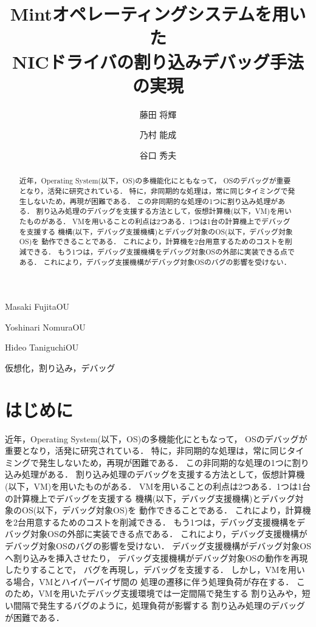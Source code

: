 \documentclass[submit,techreq,noauthor,dvipdfmx]{ipsj}
\begin{document}
\title{Mintオペレーティングシステムを用いた\\NICドライバの割り込みデバッグ手法の実現}


\author{藤田 将輝}{Masaki Fujita}{OU}
\author{乃村 能成}{Yoshinari Nomura}{OU}
\author{谷口 秀夫}{Hideo Taniguchi}{OU}

\begin{abstract}

    近年，Operating System(以下，OS)の多機能化にともなって，
    OSのデバッグが重要となり，活発に研究されている．
    特に，非同期的な処理は，常に同じタイミングで発生しないため，再現が困難である．
    この非同期的な処理の1つに割り込み処理がある．
    割り込み処理のデバッグを支援する方法として，仮想計算機(以下，VM)を用いたものがある．
    VMを用いることの利点は2つある．1つは1台の計算機上でデバッグを支援する
    機構(以下，デバッグ支援機構)とデバッグ対象のOS(以下，デバッグ対象OS)を
    動作できることである．
    これにより，計算機を2台用意するためのコストを削減できる．
    もう1つは，デバッグ支援機構をデバッグ対象OSの外部に実装できる点である．
    これにより，デバッグ支援機構がデバッグ対象OSのバグの影響を受けない．

\end{abstract}

\begin{jkeyword}
    仮想化，割り込み，デバッグ
\end{jkeyword}
\maketitle

\section{はじめに}

近年，Operating System(以下，OS)の多機能化にともなって，
OSのデバッグが重要となり，活発に研究されている．
特に，非同期的な処理は，常に同じタイミングで発生しないため，再現が困難である．
この非同期的な処理の1つに割り込み処理がある．
割り込み処理のデバッグを支援する方法として，仮想計算機(以下，VM)を用いたものがある．
VMを用いることの利点は2つある．1つは1台の計算機上でデバッグを支援する
機構(以下，デバッグ支援機構)とデバッグ対象のOS(以下，デバッグ対象OS)を
動作できることである．
これにより，計算機を2台用意するためのコストを削減できる．
もう1つは，デバッグ支援機構をデバッグ対象OSの外部に実装できる点である．
これにより，デバッグ支援機構がデバッグ対象OSのバグの影響を受けない．
デバッグ支援機構がデバッグ対象OSへ割り込みを挿入させたり，
デバッグ支援機構がデバッグ対象OSの動作を再現したりすることで，
バグを再現し，デバッグを支援する．
しかし，VMを用いる場合，VMとハイパーバイザ間の
処理の遷移に伴う処理負荷が存在する．
このため，VMを用いたデバッグ支援環境では一定間隔で発生する
割り込みや，短い間隔で発生するバグのように，処理負荷が影響する
割り込み処理のデバッグが困難である．
\end{document}
